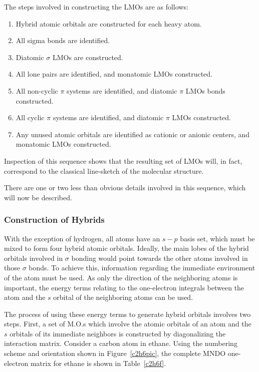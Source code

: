 The steps involved in constructing the LMOs are as follows:
\begin{enumerate}
\item Hybrid atomic orbitals are constructed for each heavy atom.
\item All sigma bonds are identified.
\item Diatomic $\sigma$ LMOs are constructed.
\item All lone pairs are identified, and monatomic LMOs constructed.
\item All non-cyclic $\pi$ systems are identified, and diatomic $\pi$ LMOs
 bonds constructed.
\item All cyclic $\pi$ systems are identified, and diatomic $\pi$ LMOs
constructed.
\item Any unused atomic orbitals are identified as cationic or anionic centers,
and monatomic LMOs constructed.
\end{enumerate}

Inspection of this sequence shows that the resulting set of LMOs will, in fact,
correspond to the classical line-sketch of the molecular structure.

There are one or two less than obvious details involved in this sequence, which
will now be described.

\subsubsection{Construction of Hybrids}\label{make_hybrid}

With the exception of hydrogen, all atoms have an $s-p$ basis set, which must
be mixed to form four hybrid atomic orbitals.  Ideally, the main lobes of the
hybrid orbitals involved in $\sigma$ bonding would point towards the other
atoms involved in those $\sigma$ bonds.  To achieve this, information regarding
the immediate environment of the atom must be used.  As only the 
direction of the neighboring atoms is important, the energy terms relating
to the one-electron integrals between the atom and the $s$ orbital of the
neighboring atoms can be used.

The process of using these energy terms to generate hybrid orbitals involves
two steps.  First, a set of M.O.s which involve the atomic orbitals of an
atom and the $s$ orbitals of its immediate neighbors is constructed by
diagonalizing the interaction matrix.  Consider a carbon atom in 
ethane.  Using the numbering scheme and orientation shown in 
Figure~\ref{c2h6pic}, the complete MNDO one-electron matrix for ethane is 
shown in Table~\ref{c2h6f}.

